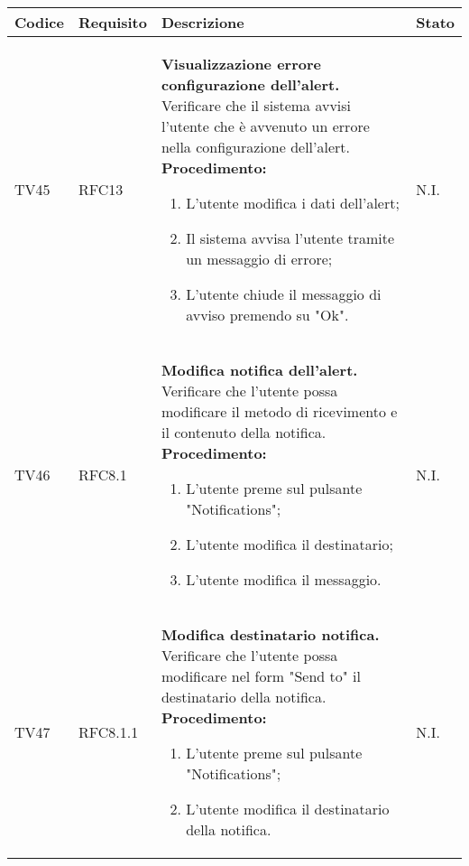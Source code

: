 \begin{table}[!htpb]
	\centering
	\renewcommand{\arraystretch}{2} 
	\begin{tabular}{|l|l|p{10cm}|l|}
		\rowcolor{orange!50}
		\hline
		\textbf{Codice} & \textbf{Requisito}& \textbf{Descrizione} & \textbf{Stato}\\ 
		\hline
		TV45 & RFC13 &
			\textbf{Visualizzazione errore configurazione dell'alert.} 
			\newline
			Verificare che il sistema avvisi l’utente che è avvenuto un errore nella configurazione dell'alert. 
			\newline 
			\textbf{Procedimento:} 
			\begin{enumerate} 
				\item L'utente modifica i dati dell'alert; 
				\item Il sistema avvisa l’utente tramite un messaggio di errore; 
				\item L'utente chiude il messaggio di avviso premendo su "Ok".		
			\end{enumerate} 
			& N.I.\\
		\hline
		TV46 & RFC8.1 &
			\textbf{Modifica notifica dell'alert.} 
			\newline
			Verificare che l’utente possa modificare il metodo di ricevimento e il contenuto della notifica. 
			\newline 
			\textbf{Procedimento:} 
			\begin{enumerate} 
				\item L'utente preme sul pulsante "Notifications"; 
				\item L'utente modifica il destinatario; 
				\item L'utente modifica il messaggio.		
			\end{enumerate} 
			& N.I.\\
		\hline
		TV47 & RFC8.1.1 &
			\textbf{Modifica destinatario notifica.}
			\newline
			Verificare che l'utente possa modificare nel form "Send to" il destinatario della notifica.
			\newline
			\textbf{Procedimento:}
			\begin{enumerate}
				\item L'utente preme sul pulsante "Notifications"; 
				\item L’utente modifica il destinatario della notifica.
			\end{enumerate} 
			& N.I.\\
		\hline
	\end{tabular}
\end{table}
